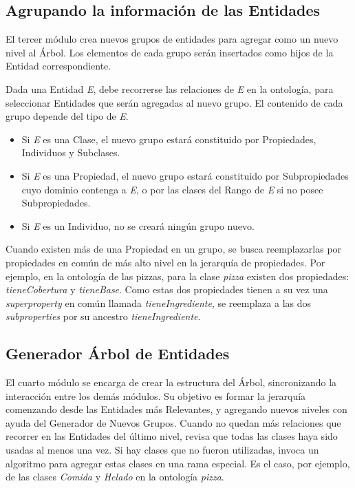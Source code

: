 \subsection{Agrupando la información de las Entidades}
\label{sec:agrupando_info}
El tercer módulo crea nuevos grupos de entidades para agregar como un nuevo nivel al Árbol. Los elementos de cada grupo serán insertados como hijos de la Entidad correspondiente.

Dada una Entidad \emph{E}, debe recorrerse las relaciones de \emph{E} en la ontología, para seleccionar Entidades que serán agregadas al nuevo grupo.
El contenido de cada grupo depende del tipo de \emph{E}.
\begin{itemize}
    \item Si \emph{E} es una Clase, el nuevo grupo estará constituido por Propiedades, Individuos y Subclases. 
    \item Si \emph{E} es una Propiedad, el nuevo grupo estará constituido por Subpropiedades cuyo dominio contenga a \emph{E}, o por las clases del Rango de \emph{E} si no posee Subpropiedades.
    \item Si \emph{E} es un Individuo, no se creará ningún grupo nuevo.
\end{itemize}

Cuando existen más de una Propiedad en un grupo, se busca reemplazarlas por propiedades en común de más alto nivel en la jerarquía de propiedades. Por ejemplo, en la ontología de las pizzas, para la clase \emph{pizza} existen dos propiedades: \emph{tieneCobertura} y \emph{tieneBase}. Como estas dos propiedades tienen a su vez una \emph{superproperty} en común llamada \emph{tieneIngrediente}, se reemplaza a las dos \emph{subproperties} por su ancestro \emph{tieneIngrediente}.



\subsection{Generador Árbol de Entidades}
El cuarto módulo se encarga de crear la estructura del Árbol, sincronizando la interacción entre los demás módulos. Su objetivo es formar la jerarquía comenzando desde las Entidades más Relevantes, y agregando nuevos niveles con ayuda del Generador de Nuevos Grupos. Cuando no quedan más relaciones que recorrer en las Entidades del último nivel, revisa que todas las clases haya sido usadas al menos una vez. Si hay clases que no fueron utilizadas, invoca un algoritmo para agregar estas clases en una rama especial. Es el caso, por ejemplo, de las clases \emph{Comida} y \emph{Helado} en la ontología \emph{pizza}.


